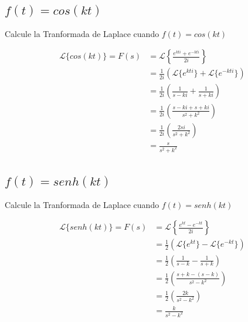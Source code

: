 \documentclass[12pt]{report}                                %
\begin{document}
        \subsection{$f(t) = cos(kt)$}
            Calcule la Tranformada de Laplace cuando $f(t) = cos(kt)$

            \begin{equation*}   
            \begin{split}
                \mathscr{L}\{cos(kt)\}
                    = F(s) & = \mathscr{L}\left\{ \frac{e^{kti} + e^{-kti}}{2i} \right\}             \\
                    & = \frac{1}{2i} \left(\mathscr{L}\{e^{kti}\}+\mathscr{L}\{e^{-kti}\}\right)     \\
                    & = \frac{1}{2i} \left( \frac{1}{s-ki} + \frac{1}{s+ki} \right)                  \\
                    & = \frac{1}{2i} \left( \frac{s-ki+s+ki}{s^2+k^2} \right)                        \\
                    & = \frac{1}{2i} \left( \frac{2si}{s^2+k^2} \right)                              \\
                    & = \frac{s}{s^2+k^2}                                                            \\
            \end{split}
            \end{equation*}

        \clearpage
        \subsection{$f(t) = senh(kt)$}
            Calcule la Tranformada de Laplace cuando $f(t) = senh(kt)$

            \begin{equation*}   
            \begin{split}
                \mathscr{L}\{senh(kt)\}
                    = F(s) & = \mathscr{L}\left\{ \frac{e^{kt} - e^{-kt}}{2i} \right\}             \\
                    & = \frac{1}{2} \left(\mathscr{L}\{e^{kt}\}-\mathscr{L}\{e^{-kt}\}\right)      \\
                    & = \frac{1}{2} \left( \frac{1}{s-k} - \frac{1}{s+k} \right)                   \\
                    & = \frac{1}{2} \left( \frac{s+k-(s-k)}{s^2-k^2} \right)                       \\
                    & = \frac{1}{2} \left( \frac{2k}{s^2-k^2} \right)                              \\
                    & = \frac{k}{s^2-k^2}                                                          \\
            \end{split}
            \end{equation*}
\end{document}
